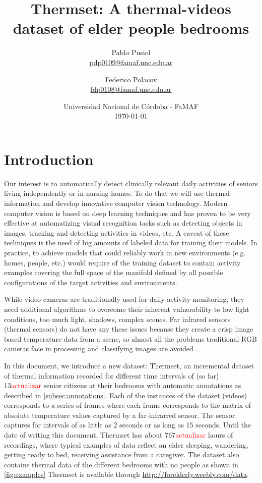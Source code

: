 \documentclass[oneside, twocolumn]{article}
\title{\LARGE Thermset: A thermal-videos dataset of elder people bedrooms} %
\author{Pablo Pusiol\\ \href{mailto:pdp0109@famaf.unc.edu.ar \qquad Pablo Pusiol }{pdp0109@famaf.unc.edu.ar} \and Federico Polacov \\\href{mailto:fdp0108@famaf.unc.edu.ar}{fdp0108@famaf.unc.edu.ar}}
\date{Universidad Nacional de C\'ordoba - FaMAF \\ \today}
\newcommand\myworries[1]{\textcolor{red}{#1}}
\begin{document}
\maketitle


\section{Introduction}
\label{sec:introduction}
Our interest is to automatically detect clinically relevant daily activities of seniors living independently or in nursing homes. To do that we will use thermal information and develop innovative computer vision technology. Modern computer vision is based on deep learning techniques and has proven to be very effective at automatizing visual recognition tasks such as detecting objects in images, tracking and detecting activities in videos, etc. A caveat of these techniques is the need of big amounts of labeled data for training their models. In practice, to achieve  models that could reliably work in new  environments (e.g. homes, people, etc.) would require of the training dataset to contain activity examples covering the full space of the manifold defined by all possible configurations of the target activities and environments.

While video cameras are traditionally used for daily activity monitoring, they need additional algorithms to overcome their inherent vulnerability to low light conditions, too much light, shadows, complex scenes. Far infrared sensors (thermal sensors) do not have any these issues because they create a crisp image based temperature data from a scene, so almost all the problems traditional RGB cameras face in processing and classifying images are avoided \cite{chengl}.

In this document, we introduce a new dataset: Thermset, an incremental dataset of thermal information recorded for different time intervals of (so far) 13\myworries{actualizar} senior citizens at their bedrooms with automatic annotations as described in \autoref{subsec:annotations}. Each of the instances of the dataset (videos) corresponds to a series of frames where each frame corresponds to the matrix of absolute temperature values captured by a far-infrarred sensor. The sensor captures for intervals of as little as 2 seconds or as long as 15 seconds. Until the date of writing this document, Thermset has about 767\myworries{actualizar} hours of recordings, where typical examples of data reflect an elder sleeping, wandering, getting ready to bed, receiving assistance from a caregiver. The dataset also contains thermal data of the different bedrooms with no people as shown in \autoref{fig:examples} Thermset is available through \url{http://forelderly.weebly.com/data}.
\end{document}
